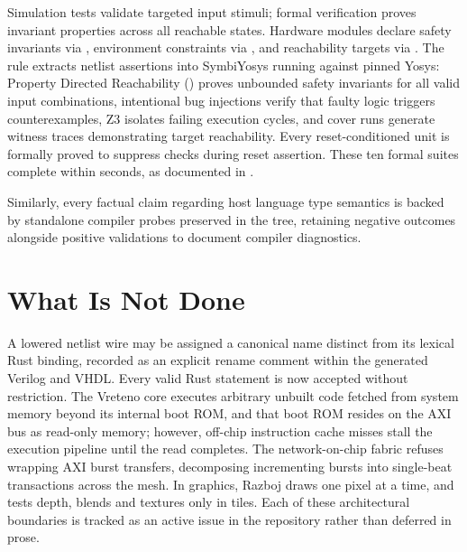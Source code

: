 \documentclass[journal,9pt]{IEEEtran}
\begin{document}
Simulation tests validate targeted input stimuli; formal verification proves
invariant properties across all reachable states. Hardware modules declare
safety invariants via , environment constraints via
, and reachability targets via . The
 rule extracts netlist assertions into SymbiYosys running
against pinned Yosys: Property Directed Reachability () proves
unbounded safety invariants for all valid input combinations, intentional bug
injections verify that faulty logic triggers counterexamples, Z3 isolates
failing execution cycles, and cover runs generate witness traces demonstrating
target reachability. Every reset-conditioned unit is formally proved to suppress
checks during reset assertion. These ten formal suites complete within seconds,
as documented in .

Similarly, every factual claim regarding host language type semantics is backed
by standalone compiler probes preserved in the tree, retaining negative
outcomes alongside positive validations to document compiler diagnostics.

\section{What Is Not Done}

A lowered netlist wire may be assigned a canonical name distinct from its
lexical Rust binding, recorded as an explicit rename comment within the
generated Verilog and VHDL. Every valid Rust  statement is now
accepted without restriction. The Vreteno core executes arbitrary unbuilt code
fetched from system memory beyond its internal boot ROM, and that boot ROM
resides on the AXI bus as read-only memory; however, off-chip instruction cache
misses stall the execution pipeline until the read completes. The
network-on-chip fabric refuses wrapping AXI burst transfers, decomposing
incrementing bursts into single-beat transactions across the mesh. In graphics,
Razboj draws one pixel at a time, and tests depth, blends and textures only in tiles. Each of these architectural boundaries is
tracked as an active issue in the repository rather than deferred in prose.
\end{document}
